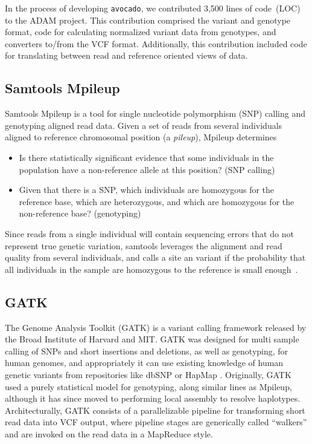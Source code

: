 \documentclass{acm_proc_article-sp}
\begin{document}
In the process of developing \texttt{avocado}, we contributed 3,500 lines of code~(LOC) to the ADAM project. This contribution comprised
the variant and genotype format, code for calculating normalized variant data from genotypes, and converters to/from the VCF format.
Additionally, this contribution included code for translating between read and reference oriented views of data.

\subsection{Samtools Mpileup}
\label{sec:samtools}

Samtools Mpileup is a tool for single nucleotide polymorphism (SNP) calling and genotyping aligned read data.  Given a set of
reads from several individuals aligned to reference chromosomal position (a \emph{pileup}), Mpileup determines
\begin{itemize}
\item Is there statistically significant evidence that some individuals in the population have a non-reference allele at this position? (SNP calling)
\item Given that there is a SNP, which individuals are homozygous for the reference base, which are heterozygous, and which are homozygous
for the non-reference base? (genotyping)
\end{itemize}
Since reads from a single individual will contain sequencing errors that do not represent true genetic variation, samtools leverages
the alignment and read quality from several individuals, and calls a site an variant if  the probability that all individuals in the sample
are homozygous to the reference is small enough~\cite{li11}.

\subsection{GATK}
\label{sec:gatk}


The Genome Analysis Toolkit (GATK) \cite{mckenna10, depristo11}
is a variant calling framework released by the Broad Institute of Harvard and MIT.
GATK was designed for multi sample calling of SNPs and short insertions and deletions,
as well as genotyping, for human genomes,
and appropriately it can use existing knowledge of human genetic variants
from repositories like dbSNP \cite{sherry01} or HapMap \cite{hapmap}.
Originally, GATK used a purely statistical model for genotyping, along similar
lines as Mpileup, although it has since moved to performing local assembly to
resolve haplotypes.
Architecturally, GATK consists of a parallelizable pipeline for transforming
short read data into VCF output, where pipeline stages are generically called
``walkers'' and are invoked on the read data in a MapReduce style.
\end{document}

